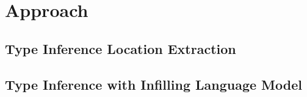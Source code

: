 \section{{\tool} Approach}
\label{sec:approach}




\subsection{Type Inference Location Extraction}\label{sec:tile}


\subsection{Type Inference with Infilling Language Model}\label{sec:ilm}


